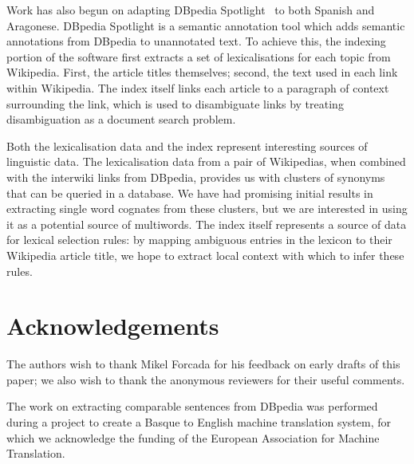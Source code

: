 \documentclass[10pt,a4paper,twocolumn]{article}
\begin{document}
  Work has also begun on adapting DBpedia Spotlight~\cite{spotlight} to both Spanish and Aragonese. DBpedia Spotlight is a semantic annotation tool which adds semantic annotations from DBpedia to unannotated text. To achieve this, the indexing portion of the software first extracts a set of lexicalisations for each topic from Wikipedia. First, the article titles themselves; second, the text used in each link within Wikipedia. The index itself links each article to a paragraph of context surrounding the link, which is used to disambiguate links by treating disambiguation as a document search problem.

  Both the lexicalisation data and the index represent interesting sources of linguistic data. The lexicalisation data from a pair of Wikipedias, when combined with the interwiki links from DBpedia, provides us with clusters of synonyms that can be queried in a database. We have had promising initial results in extracting single word cognates from these clusters, but we are interested in using it as a potential source of multiwords. The index itself represents a source of data for lexical selection rules: by mapping ambiguous entries in the lexicon to their Wikipedia article title, we hope to extract local context with which to infer these rules.

  \section{Acknowledgements}

  The authors wish to thank Mikel Forcada for his feedback on early drafts of this paper; we also wish to thank the anonymous reviewers for their useful comments.

  The work on extracting comparable sentences from DBpedia was performed during a project to create a Basque to English machine translation system, for which we acknowledge the funding of the European Association for Machine Translation.



  
\end{document}
